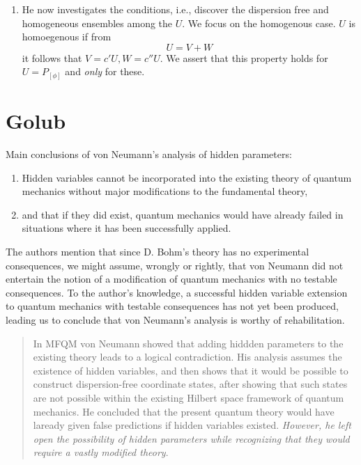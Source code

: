 \documentclass[a4paper]{article}
\theoremstyle{definition}
\theoremstyle{plain}
\begin{document}
\begin{enumerate}
{                Wait, is this where he defined the
                statistical operator know the as the density
            matrix?}
        \item He now investigates the conditions, i.e.,
            discover the dispersion free and homogeneous
            ensembles among the $U$. We focus on the
            homogenous case. $U$ is homoegenous if from 
            \begin{equation}
                U = V + W
            \end{equation}
            it follows that $V = c'U, W = c''U$. We assert
            that this property holds for $U = P_{[\phi]}$ 
            and \textit{only} for these.
    \end{enumerate}

    \section{Golub}

    Main conclusions of von Neumann's analysis of hidden
    parameters:
    \begin{enumerate}
        \item Hidden variables cannot be incorporated into
            the existing theory of quantum mechanics without
            major modifications to the fundamental theory,
        \item and that if they did exist, quantum mechanics
            would have already failed in situations where it
            has been successfully applied.
    \end{enumerate}

    The authors mention that since D. Bohm's theory has no
    experimental consequences, we might assume, wrongly or
    rightly, that von Neumann did not entertain the notion
    of a modification of quantum mechanics with no testable
    consequences. To the author's knowledge, a successful
    hidden variable extension to quantum mechanics with
    testable consequences has not yet been produced, leading
    us to conclude that von Neumann's analysis is worthy of
    rehabilitation.

    \begin{quote}
        In MFQM von Neumann showed that adding hiddden
        parameters to the existing theory leads to a logical
        contradiction. His analysis assumes the existence of
        hidden variables, and then shows that it would be
        possible to construct dispersion-free coordinate
        states, after showing that such states are not
        possible within the existing Hilbert space framework
        of quantum mechanics. He concluded that the present
        quantum theory would have laready given false
        predictions if hidden variables existed.
        \textit{However, he left open the possibility of
        hidden parameters while recognizing that they would
        require a vastly modified theory}.
    \end{quote}
\end{document}
